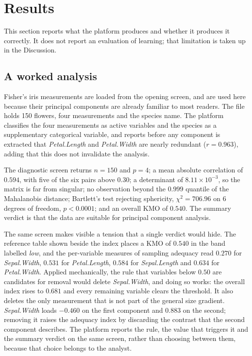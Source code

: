 \documentclass[12pt]{article}
\begin{document}
\section{Results}


This section reports what the platform produces and whether it produces it
correctly. It does not report an evaluation of learning; that limitation is
taken up in the Discussion.

\subsection{A worked analysis}

Fisher's iris measurements \citep{fisher1936} are loaded from the opening
screen, and are used here because their principal components are already
familiar to most readers. The file holds 150 flowers, four measurements and the
species name. The platform classifies the four measurements as active variables
and the species as a supplementary categorical variable, and reports before any
component is extracted that \emph{Petal.Length} and \emph{Petal.Width} are
nearly redundant ($r = 0.963$), adding that this does not invalidate the
analysis.

The diagnostic screen returns $n = 150$ and $p = 4$; a mean absolute
correlation of $0.594$, with five of the six pairs above $0.30$; a determinant
of $8.11 \times 10^{-3}$, so the matrix is far from singular; no observation
beyond the $0.999$ quantile of the Mahalanobis distance; Bartlett's test
rejecting sphericity, $\chi^2 = 706.96$ on $6$ degrees of freedom,
$p < 0.0001$; and an overall KMO of $0.540$. The summary verdict is that the
data are suitable for principal component analysis.

The same screen makes visible a tension that a single verdict would hide. The
reference table shown beside the index places a KMO of $0.540$ in the band
labelled \emph{low}, and the per-variable measures of sampling adequacy read
$0.270$ for \emph{Sepal.Width}, $0.531$ for \emph{Petal.Length}, $0.584$ for
\emph{Sepal.Length} and $0.634$ for \emph{Petal.Width}. Applied
mechanically, the rule that variables below $0.50$ are candidates for removal
would delete \emph{Sepal.Width}, and doing so works: the overall index rises to
$0.681$ and every remaining variable clears the threshold. It also deletes the
only measurement that is not part of the general size gradient.
\emph{Sepal.Width} loads $-0.460$ on the first component and $0.883$ on the
second; removing it raises the adequacy index by discarding the contrast that
the second component describes. The platform reports the rule, the value that
triggers it and the summary verdict on the same screen, rather than choosing
between them, because that choice belongs to the analyst.
\end{document}
